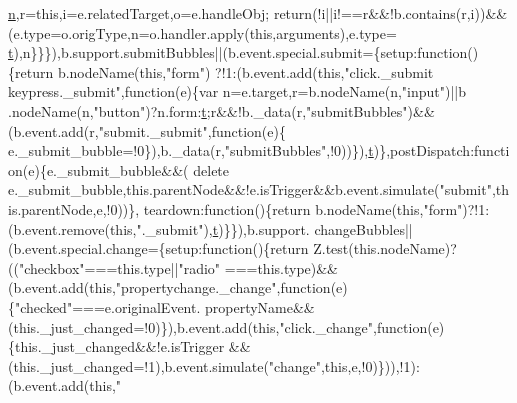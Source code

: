 \begin{DoxyCode}
{{      \hyperlink{root_2static_2root_2js_2bootstrap_2jquery-ui-1_810_84_8custom_8min_8js_afc984c4f6c68ce30a0af99006f5f8d27}{n},r=\textcolor{keyword}{this},i=e.relatedTarget,o=e.handleObj;
\textcolor{keywordflow}{return}(!i||i!==r&&!b.contains(r,i))&&(e.type=o.origType,n=o.handler.apply(\textcolor{keyword}{this},arguments),e.type=
      \hyperlink{jquery-1_89_81_8min_8js_a23c5666e83bbbceee94adcd0851f50c4}{t}),n\}\}\}),b.support.submitBubbles||(b.event.special.submit=\{setup:\textcolor{keyword}{function}()\{\textcolor{keywordflow}{return} b.nodeName(\textcolor{keyword}{this},\textcolor{stringliteral}{"form"})
      ?!1:(b.event.add(\textcolor{keyword}{this},\textcolor{stringliteral}{"click.\_submit keypress.\_submit"},\textcolor{keyword}{function}(e)\{var n=e.target,r=b.nodeName(n,\textcolor{stringliteral}{"input"})||b
      .nodeName(n,\textcolor{stringliteral}{"button"})?n.form:\hyperlink{jquery-1_89_81_8min_8js_a23c5666e83bbbceee94adcd0851f50c4}{t};r&&!b.\_data(r,\textcolor{stringliteral}{"submitBubbles"})&&(b.event.add(r,\textcolor{stringliteral}{"submit.\_submit"},\textcolor{keyword}{function}(e)\{
      e.\_submit\_bubble=!0\}),b.\_data(r,\textcolor{stringliteral}{"submitBubbles"},!0))\}),\hyperlink{jquery-1_89_81_8min_8js_a23c5666e83bbbceee94adcd0851f50c4}{t})\},postDispatch:\textcolor{keyword}{function}(e)\{e.\_submit\_bubble&&(\textcolor{keyword}{
      delete} e.\_submit\_bubble,this.parentNode&&!e.isTrigger&&b.event.simulate(\textcolor{stringliteral}{"submit"},this.parentNode,e,!0))\},
      teardown:\textcolor{keyword}{function}()\{\textcolor{keywordflow}{return} b.nodeName(\textcolor{keyword}{this},\textcolor{stringliteral}{"form"})?!1:(b.event.remove(\textcolor{keyword}{this},\textcolor{stringliteral}{".\_submit"}),\hyperlink{jquery-1_89_81_8min_8js_a23c5666e83bbbceee94adcd0851f50c4}{t})\}\}),b.support.
      changeBubbles||(b.event.special.change=\{setup:\textcolor{keyword}{function}()\{\textcolor{keywordflow}{return} Z.test(this.nodeName)?((\textcolor{stringliteral}{"checkbox"}===this.type||\textcolor{stringliteral}{"radio"}
      ===this.type)&&(b.event.add(\textcolor{keyword}{this},\textcolor{stringliteral}{"propertychange.\_change"},\textcolor{keyword}{function}(e)\{\textcolor{stringliteral}{"checked"}===e.originalEvent.
      propertyName&&(\textcolor{keyword}{this}.\_just\_changed=!0)\}),b.event.add(\textcolor{keyword}{this},\textcolor{stringliteral}{"click.\_change"},\textcolor{keyword}{function}(e)\{\textcolor{keyword}{this}.\_just\_changed&&!e.isTrigger
      &&(\textcolor{keyword}{this}.\_just\_changed=!1),b.event.simulate(\textcolor{stringliteral}{"change"},\textcolor{keyword}{this},e,!0)\})),!1):(b.event.add(\textcolor{keyword}{this},\textcolor{stringliteral}{"
}}}
\end{DoxyCode}
